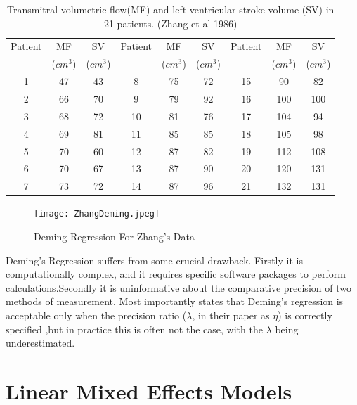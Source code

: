 \documentclass[12pt, a4paper]{report}
\begin{document}
\newpage
\begin{table}[h!]
\begin{center}
\begin{tabular}{|c|c|c||c|c|c||c|c|c|}
  \hline
 Patient & MF  & SV  & Patient & MF  & SV  & Patient & MF  & SV \\
 &($cm^{3}$)&  ($cm^{3}$) & &($cm^{3}$)&  ($cm^{3}$) & &($cm^{3}$)&  ($cm^{3}$)
 \\
  \hline
1 & 47 & 43 &  8 & 75 & 72 &  15 & 90 & 82 \\
  2 & 66 & 70 & 9 & 79 & 92 &  16 & 100 & 100 \\
  3 & 68 & 72 & 10 & 81 & 76 & 17 & 104 & 94 \\
  4 & 69 & 81 & 11 & 85 & 85 &  18 & 105 & 98 \\
  5 & 70 & 60 & 12 & 87 & 82 & 19 & 112 & 108 \\
  6 & 70 & 67 & 13 & 87 & 90 & 20 & 120 & 131 \\
  7 & 73 & 72 & 14 & 87 & 96 &  21 & 132 & 131 \\

   \hline
\end{tabular}
\caption{Transmitral volumetric flow(MF) and left ventricular
stroke volume (SV) in 21 patients. (Zhang et al 1986)}
\end{center}
\end{table}
\newpage
\begin{figure}[h!]
  \texttt{[image: ZhangDeming.jpeg]}
  \caption{Deming Regression For Zhang's Data}\label{ZhangDeming}
\end{figure}

Deming's Regression suffers from some crucial drawback. Firstly it
is computationally complex, and it requires specific software
packages to perform calculations.Secondly it is uninformative
about the comparative precision of two methods of measurement.
Most importantly \citet{CarollRupert} states that Deming's
regression is acceptable only when the precision ratio ($\lambda$,
in their paper as $\eta$) is correctly specified ,but in practice
this is often not the case, with the $\lambda$ being
underestimated.
\newpage


\chapter{Linear Mixed Effects Models}
\end{document}
